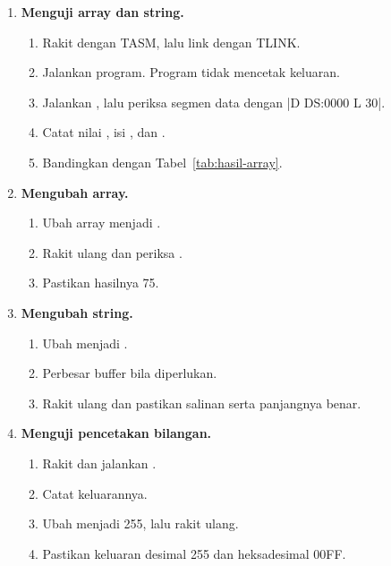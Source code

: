 \begin{enumerate}
    \item \textbf{Menguji array dan string.}
    \begin{enumerate}
        \item Rakit  dengan TASM, lalu link
              dengan TLINK.
        \item Jalankan program. Program tidak mencetak keluaran.
        \item Jalankan , lalu periksa
              segmen data dengan \lstasm|D DS:0000 L 30|.
        \item Catat nilai , isi , dan
              .
        \item Bandingkan dengan Tabel~\ref{tab:hasil-array}.
    \end{enumerate}

    \item \textbf{Mengubah array.}
    \begin{enumerate}
        \item Ubah array menjadi .
        \item Rakit ulang dan periksa .
        \item Pastikan hasilnya 75.
    \end{enumerate}

    \item \textbf{Mengubah string.}
    \begin{enumerate}
        \item Ubah  menjadi .
        \item Perbesar buffer  bila diperlukan.
        \item Rakit ulang dan pastikan salinan serta panjangnya
              benar.
    \end{enumerate}

    \item \textbf{Menguji pencetakan bilangan.}
    \begin{enumerate}
        \item Rakit dan jalankan .
        \item Catat keluarannya.
        \item Ubah  menjadi 255, lalu rakit ulang.
        \item Pastikan keluaran desimal 255 dan heksadesimal 00FF.
    \end{enumerate}


\end{enumerate}
